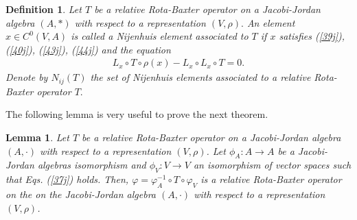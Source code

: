 \documentclass[12pt]{amsart}
\newtheorem{definition}[Theorem]{Definition}
\newtheorem{lemma}[Theorem]{Lemma}
\begin{document}
	\begin{definition}
		Let $T$ be a relative Rota-Baxter operator on a Jacobi-Jordan algebra $(A,\ast )$ with 
		respect to a representation $(V, \rho).$ An element $x\in C^0(V,A)$ is called a Nijenhuis element associated to $T$ if $x$ satisfies (\ref{39j}), (\ref{40j}), (\ref{43j}), (\ref{44j}) and the equation
		\begin{eqnarray}
			L_x\circ T\circ\rho(x)-L_{x}\circ L_{x}\circ T=0.
			\label{N1}
		\end{eqnarray}
		Denote by $N_{ij}(T )$ the set of Nijenhuis elements associated to a relative Rota-Baxter operator $T.$
	\end{definition}
	The following lemma is very useful to prove the next theorem.
	\begin{lemma}\label{LemT1}
		Let $T$ be a relative Rota-Baxter operator on a Jacobi-Jordan algebra $(A,\cdot)$ with
		respect to a representation $(V,\rho)$. 
		Let $\phi_A: A\rightarrow A$ be a Jacobi-Jordan algebras isomorphism and $\phi_V: V\rightarrow V$
		an isomorphism of vector spaces such that Eqs.
		(\ref{37j}) holds. Then, 
		$	\varphi=\varphi_A^{-1}\circ T\circ\varphi_V$ 
		is a relative Rota-Baxter operator on the on the Jacobi-Jordan algebra $(A,\cdot)$ with
		respect to a representation $(V,\rho)$.
	\end{lemma}
\end{document}
